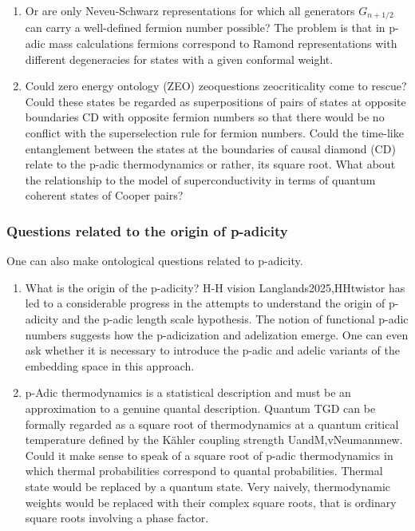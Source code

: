 \documentclass[10pt,epsf]{article}
\begin{document}
{\begin{enumerate}
\item Or are only Neveu-Schwarz representations for which all generators $G_{n+1/2}$ can  carry a well-defined fermion number possible?  The problem is that in p-adic mass calculations fermions correspond to Ramond representations with different degeneracies for states with a given conformal weight.  

\item Could zero energy ontology (ZEO) \cite{alb}{zeoquestions} \cite{btart}{zeocriticality} come to   rescue? Could these states  be regarded as  superpositions of pairs of states at opposite boundaries CD with opposite fermion numbers so that there would be no conflict with the superselection rule for fermion numbers. Could the time-like entanglement between  the states at the boundaries of causal diamond (CD)  relate to the  p-adic thermodynamics or rather, its square root. What about the relationship to the model of superconductivity in terms of quantum coherent states of Cooper pairs?

\end{enumerate}



\subsubsection{Questions related to the origin of p-adicity}

One can also make ontological questions related to p-adicity.

\begin{enumerate}

\item What is the origin of the p-adicity? H-H vision \cite{btart}{Langlands2025,HHtwistor} has led to a considerable progress in the attempts to understand the origin of p-adicity and the  p-adic length scale hypothesis. The notion of functional  p-adic numbers suggests how the p-adicization and  adelization  emerge.  One can even ask whether it is  necessary to introduce the p-adic and adelic  variants of the embedding space in this approach.


\item  p-Adic thermodynamics  is a statistical description and must be an approximation to a genuine quantal description.  Quantum TGD can be formally regarded as a square  root of thermodynamics at a quantum critical temperature defined by the  K\"ahler coupling strength  \cite{allb}{UandM,vNeumannnew}. Could it make sense to speak of a square root of p-adic thermodynamics in which thermal probabilities correspond to quantal probabilities. Thermal state would be replaced by a  quantum state.  Very naively, thermodynamic weights would be replaced with their complex square roots, that is ordinary square roots  involving a phase factor.


\end{enumerate}}
\end{document}
